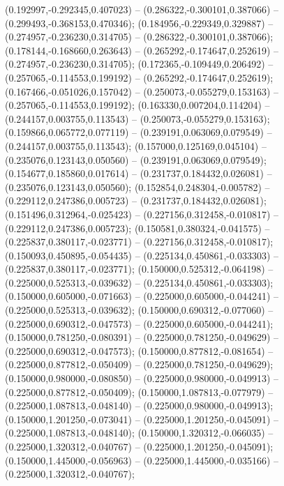 (0.192997,-0.292345,0.407023) -- (0.286322,-0.300101,0.387066) -- (0.299493,-0.368153,0.470346);
 (0.184956,-0.229349,0.329887) -- (0.274957,-0.236230,0.314705) -- (0.286322,-0.300101,0.387066);
 (0.178144,-0.168660,0.263643) -- (0.265292,-0.174647,0.252619) -- (0.274957,-0.236230,0.314705);
 (0.172365,-0.109449,0.206492) -- (0.257065,-0.114553,0.199192) -- (0.265292,-0.174647,0.252619);
 (0.167466,-0.051026,0.157042) -- (0.250073,-0.055279,0.153163) -- (0.257065,-0.114553,0.199192);
 (0.163330,0.007204,0.114204) -- (0.244157,0.003755,0.113543) -- (0.250073,-0.055279,0.153163);
 (0.159866,0.065772,0.077119) -- (0.239191,0.063069,0.079549) -- (0.244157,0.003755,0.113543);
 (0.157000,0.125169,0.045104) -- (0.235076,0.123143,0.050560) -- (0.239191,0.063069,0.079549);
 (0.154677,0.185860,0.017614) -- (0.231737,0.184432,0.026081) -- (0.235076,0.123143,0.050560);
 (0.152854,0.248304,-0.005782) -- (0.229112,0.247386,0.005723) -- (0.231737,0.184432,0.026081);
 (0.151496,0.312964,-0.025423) -- (0.227156,0.312458,-0.010817) -- (0.229112,0.247386,0.005723);
 (0.150581,0.380324,-0.041575) -- (0.225837,0.380117,-0.023771) -- (0.227156,0.312458,-0.010817);
 (0.150093,0.450895,-0.054435) -- (0.225134,0.450861,-0.033303) -- (0.225837,0.380117,-0.023771);
 (0.150000,0.525312,-0.064198) -- (0.225000,0.525313,-0.039632) -- (0.225134,0.450861,-0.033303);
 (0.150000,0.605000,-0.071663) -- (0.225000,0.605000,-0.044241) -- (0.225000,0.525313,-0.039632);
 (0.150000,0.690312,-0.077060) -- (0.225000,0.690312,-0.047573) -- (0.225000,0.605000,-0.044241);
 (0.150000,0.781250,-0.080391) -- (0.225000,0.781250,-0.049629) -- (0.225000,0.690312,-0.047573);
 (0.150000,0.877812,-0.081654) -- (0.225000,0.877812,-0.050409) -- (0.225000,0.781250,-0.049629);
 (0.150000,0.980000,-0.080850) -- (0.225000,0.980000,-0.049913) -- (0.225000,0.877812,-0.050409);
 (0.150000,1.087813,-0.077979) -- (0.225000,1.087813,-0.048140) -- (0.225000,0.980000,-0.049913);
 (0.150000,1.201250,-0.073041) -- (0.225000,1.201250,-0.045091) -- (0.225000,1.087813,-0.048140);
 (0.150000,1.320312,-0.066035) -- (0.225000,1.320312,-0.040767) -- (0.225000,1.201250,-0.045091);
 (0.150000,1.445000,-0.056963) -- (0.225000,1.445000,-0.035166) -- (0.225000,1.320312,-0.040767);
